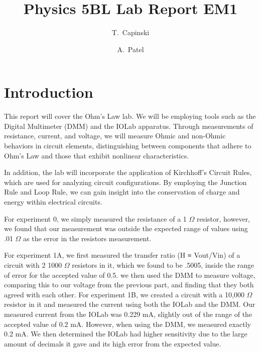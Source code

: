 \documentclass[11pt]{article}
\title{Physics 5BL Lab Report EM1}
\author{T.~Capinski \and A.~Patel}
\let\oldsection\section
\renewcommand\section{\clearpage\oldsection}
\begin{document}
    \maketitle
    \tableofcontents

    \section*{Introduction}\label{sec:introduction}

    This report will cover the Ohm's Law lab. We will be employing tools such as the Digital Multimeter (DMM) and the IOLab apparatus. Through measurements of resistance, current, and voltage, we will measure Ohmic and non-Ohmic behaviors in circuit elements, distinguishing between components that adhere to Ohm's Law and those that exhibit nonlinear characteristics.

    In addition, the lab will incorporate the application of Kirchhoff's Circuit Rules, which are used for analyzing circuit configurations. By employing the Junction Rule and Loop Rule, we can gain insight into the conservation of charge and energy within electrical circuits.

    For experiment 0, we simply measured the resistance of a 1 $\Omega$ resistor, however, we found that our measurement was outside the expected range of values using .01 $\Omega$ as the error in the resistors measurement. 

    For experiment 1A, we first measured the transfer ratio (H ≡ Vout/Vin) of a circuit with 2 1000 $\Omega$ resistors in it, which we found to be .5005, inside the range of error for the accepted value of 0.5. we then used the DMM to measure voltage, comparing this to our voltage from the previous part, and finding that they both agreed with each other. For experiment 1B, we created a circuit with a 10,000 $\Omega$ resistor in it and measured the current using both the IOLab and the DMM. Our measured current from the IOLab was 0.229 mA, slightly out of the range of the accepted value of 0.2 mA. However, when using the DMM, we measured exactly 0.2 mA. We then determined the IOLab had higher sensitivity due to the large amount of decimals it gave and its high error from the expected value.
\end{document}
